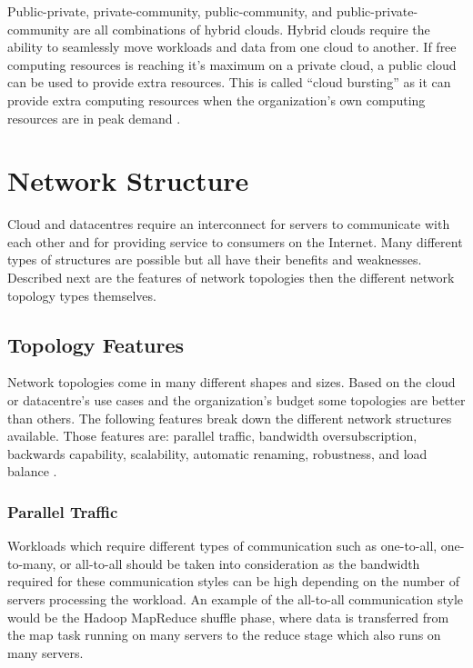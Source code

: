 \documentclass[12pt]{article}
\begin{document}
Public-private, private-community, public-community, and public-private-community are all combinations of hybrid clouds. Hybrid clouds require the ability to seamlessly move workloads and data from one cloud to another. If free computing resources is reaching it's maximum on a private cloud, a public cloud can be used to provide extra resources. This is called ``cloud bursting'' as it can provide extra computing resources when the organization's own computing resources are in peak demand \cite{dillon2010cloud}.




\section{Network Structure} \label{sec:network-structure}

Cloud and datacentres require an interconnect for servers to communicate with each other and for providing service to consumers on the Internet. Many different types of structures are possible but all have their benefits and weaknesses. Described next are the features of network topologies then the different network topology types themselves.


\subsection{Topology Features} \label{sub:topology-features}

Network topologies come in many different shapes and sizes. Based on the cloud or datacentre's use cases and the organization's budget some topologies are better than others. The following features break down the different network structures available. Those features are: parallel traffic, bandwidth oversubscription, backwards capability, scalability, automatic renaming, robustness, and load balance \cite{wang2015survey}.


\subsubsection{Parallel Traffic} \label{ssub:parallel-traffic}

Workloads which require different types of communication such as one-to-all, one-to-many, or all-to-all should be taken into consideration as the bandwidth required for these communication styles can be high depending on the number of servers processing the workload. An example of the all-to-all communication style would be the Hadoop MapReduce shuffle phase, where data is transferred from the map task running on many servers to the reduce stage which also runs on many servers.
\end{document}

